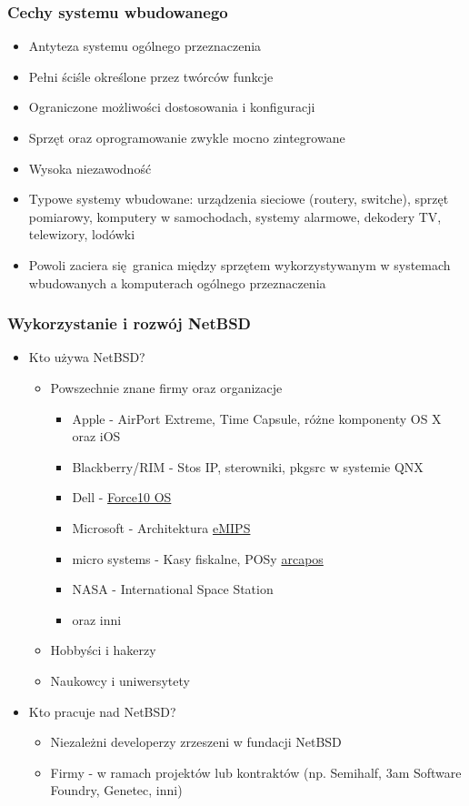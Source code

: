 \documentclass[dvipsnames,table]{beamer}
\begin{document}
\begin{frame}
\frametitle{Cechy systemu wbudowanego}
\begin{itemize}
	\item Antyteza systemu ogólnego przeznaczenia
	\item Pełni ściśle określone przez twórców funkcje
	\item Ograniczone możliwości dostosowania i konfiguracji
	\item Sprzęt oraz oprogramowanie zwykle mocno zintegrowane
	\item Wysoka niezawodność
	\item Typowe systemy wbudowane: urządzenia sieciowe (routery, switche), sprzęt pomiarowy, komputery w samochodach, systemy alarmowe, dekodery TV, telewizory, lodówki
	\item Powoli zaciera się granica między sprzętem wykorzystywanym w systemach wbudowanych a komputerach ogólnego przeznaczenia
\end{itemize}
\end{frame}

\begin{frame}
\frametitle{Wykorzystanie i rozwój NetBSD}
\begin{itemize}
\item Kto używa NetBSD?
\begin{itemize}
	\item Powszechnie znane firmy oraz organizacje
	\begin{itemize}
		\item Apple - AirPort Extreme, Time Capsule, różne komponenty OS X oraz iOS
		\item Blackberry/RIM - Stos IP, sterowniki, pkgsrc w systemie QNX
		\item Dell - \href{http://www.dell.com/us/business/p/force10-ftos/pd}{Force10 OS}
 		\item Microsoft - Architektura \href{http://research.microsoft.com/en-us/projects/emips/}{eMIPS}
		\item micro systems - Kasy fiskalne, POSy \href{http://www.arcapos.ch/produkt/}{arcapos}
		\item NASA - International Space Station
		\item oraz inni
	\end{itemize}
	\item Hobbyści i hakerzy
	\item Naukowcy i uniwersytety
\end{itemize}
\item{Kto pracuje nad NetBSD?}
\begin{itemize}
	\item Niezależni developerzy zrzeszeni w fundacji NetBSD
	\item Firmy - w ramach projektów lub kontraktów (np. Semihalf, 3am Software Foundry, Genetec, inni)
\end{itemize}

\end{itemize}
\end{frame}
\end{document}
